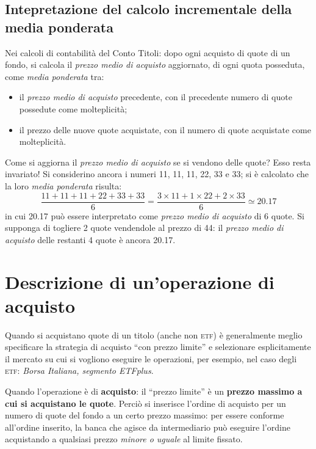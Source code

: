 \documentclass[12pt,a4paper]{article}
\newcommand{\Parentesi}[1]{(#1)}
\newcommand{\Virgolette}[1]{``#1''}
\newcommand{\Etf}[1]{\textsc{etf}}
\begin{document}
\subsection{Intepretazione del calcolo incrementale della media ponderata}

Nei calcoli di contabilità del Conto Titoli: dopo ogni  acquisto di quote di un fondo, si calcola il
\emph{prezzo medio  di acquisto} aggiornato,  di ogni  quota posseduta, come  \emph{media ponderata}
tra:
\begin{itemize}
\item il  \emph{prezzo medio di  acquisto} precedente, con il  precedente numero di  quote possedute
  come molteplicità;
\item il prezzo delle nuove quote acquistate, con il numero di quote acquistate come molteplicità.
\end{itemize}

Come  si aggiorna  il  \emph{prezzo  medio di  acquisto}  se si  vendono  delle  quote?  Esso  resta
invariato!   Si considerino  ancora  i numeri  \num{11}, \num{11},  \num{11},  \num{22}, \num{33}  e
\num{33}; si è calcolato che la loro \emph{media ponderata} risulta:
\begin{equation*}
  \frac{\num{11} + \num{11} + \num{11} + \num{22} + \num{33} + \num{33}}{6}
  = \frac{\num{3} \times{} \num{11}
     + \num{1} \times{} \num{22}
     + \num{2} \times{} \num{33}}
  {6} \simeq \num{20,17}
\end{equation*}
in cui \num{20,17}  può essere interpretato come  \emph{prezzo medio di acquisto}  di \num{6} quote.
Si supponga  di togliere \num{2} quote  vendendole al prezzo  di \num{44}: il \emph{prezzo  medio di
   acquisto} delle restanti \num{4} quote è ancora \num{20,17}.

\section{Descrizione di un'operazione di acquisto}




Quando  si  acquistano  quote di  un  titolo  \Parentesi{anche  non  \Etf{}} è  generalmente  meglio
specificare la strategia di acquisto \Virgolette{con  prezzo limite} e selezionare esplicitamente il
mercato su cui si  vogliono eseguire le operazioni, per esempio, nel  caso degli \Etf{}: \emph{Borsa
   Italiana, segmento ETFplus}.

Quando  l'operazione è  di  \textbf{acquisto}:  il \Virgolette{prezzo  limite}  è un  \textbf{prezzo
   massimo a cui si acquistano le quote}.  Perciò si inserisce l'ordine di acquisto per un numero di
quote del  fondo a un certo  prezzo massimo: per essere  conforme all'ordine inserito, la  banca che
agisce da intermediario può eseguire l'ordine  acquistando a qualsiasi prezzo \emph{minore o uguale}
al limite fissato.
\end{document}
